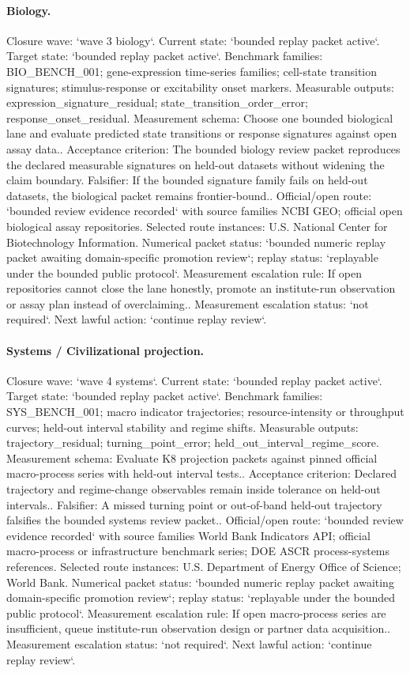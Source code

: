 \paragraph{Biology.}
Closure wave: `wave 3 biology`. Current state: `bounded replay packet active`. Target state: `bounded replay packet active`.
Benchmark families: BIO\_BENCH\_001; gene-expression time-series families; cell-state transition signatures; stimulus-response or excitability onset markers.
Measurable outputs: expression\_signature\_residual; state\_transition\_order\_error; response\_onset\_residual.
Measurement schema: Choose one bounded biological lane and evaluate predicted state transitions or response signatures against open assay data..
Acceptance criterion: The bounded biology review packet reproduces the declared measurable signatures on held-out datasets without widening the claim boundary.
Falsifier: If the bounded signature family fails on held-out datasets, the biological packet remains frontier-bound..
Official/open route: `bounded review evidence recorded` with source families NCBI GEO; official open biological assay repositories.
Selected route instances: U.S. National Center for Biotechnology Information.
Numerical packet status: `bounded numeric replay packet awaiting domain-specific promotion review`; replay status: `replayable under the bounded public protocol`.
Measurement escalation rule: If open repositories cannot close the lane honestly, promote an institute-run observation or assay plan instead of overclaiming..
Measurement escalation status: `not required`.
Next lawful action: `continue replay review`.

\paragraph{Systems / Civilizational projection.}
Closure wave: `wave 4 systems`. Current state: `bounded replay packet active`. Target state: `bounded replay packet active`.
Benchmark families: SYS\_BENCH\_001; macro indicator trajectories; resource-intensity or throughput curves; held-out interval stability and regime shifts.
Measurable outputs: trajectory\_residual; turning\_point\_error; held\_out\_interval\_regime\_score.
Measurement schema: Evaluate K8 projection packets against pinned official macro-process series with held-out interval tests..
Acceptance criterion: Declared trajectory and regime-change observables remain inside tolerance on held-out intervals..
Falsifier: A missed turning point or out-of-band held-out trajectory falsifies the bounded systems review packet..
Official/open route: `bounded review evidence recorded` with source families World Bank Indicators API; official macro-process or infrastructure benchmark series; DOE ASCR process-systems references.
Selected route instances: U.S. Department of Energy Office of Science; World Bank.
Numerical packet status: `bounded numeric replay packet awaiting domain-specific promotion review`; replay status: `replayable under the bounded public protocol`.
Measurement escalation rule: If open macro-process series are insufficient, queue institute-run observation design or partner data acquisition..
Measurement escalation status: `not required`.
Next lawful action: `continue replay review`.

